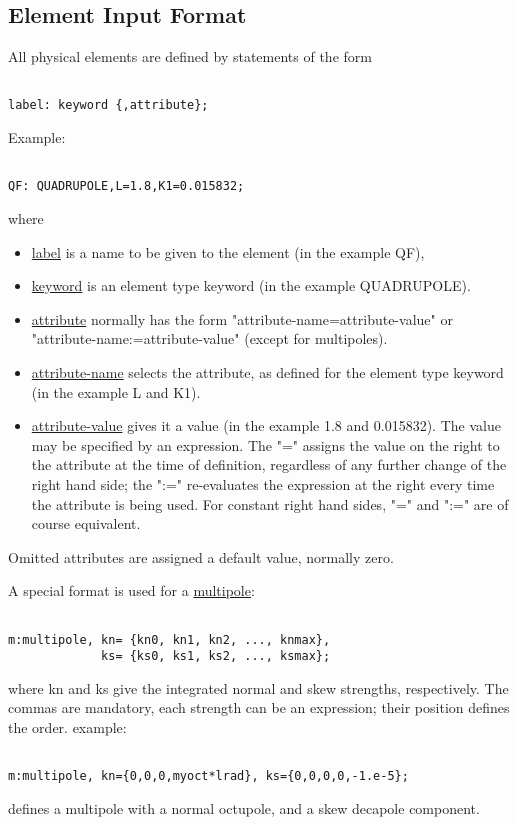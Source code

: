 




\subsection{Element Input Format}

 All physical elements are defined by statements of the form 
\begin{verbatim}

label: keyword {,attribute};
\end{verbatim} Example: 
\begin{verbatim}

QF: QUADRUPOLE,L=1.8,K1=0.015832;
\end{verbatim} where 
\begin{itemize}
	\item \href{label.html}{label} is a name to be given to the element (in the example QF), 
	\item \href{keyword.html}{keyword} is an element type keyword (in the example QUADRUPOLE). 
	\item \href{attribute.html}{attribute} normally has the form "attribute-name=attribute-value" or "attribute-name:=attribute-value" (except for multipoles). 
	\item \href{label.html}{attribute-name} selects the attribute, as defined for the element type keyword (in the example L and K1). 
	\item \href{attribute.html}{attribute-value} gives it a value (in the example 1.8 and 0.015832). The value may be specified by an expression. The "=" assigns the value on the right to the attribute at the time of definition, regardless of any further change of the right hand side; the ":=" re-evaluates the expression at the right every time the attribute is being used. For constant right hand sides, "=" and ":=" are of course equivalent. 
\end{itemize} Omitted attributes are assigned a default value, normally zero. 

 A special format is used for a \href{multipole.html}{multipole}: 
\begin{verbatim}

m:multipole, kn= {kn0, kn1, kn2, ..., knmax},
             ks= {ks0, ks1, ks2, ..., ksmax};
\end{verbatim} where kn and ks give the integrated normal and skew strengths, respectively. The commas are mandatory, each strength can be an expression; their position defines the order. example: 
\begin{verbatim}

m:multipole, kn={0,0,0,myoct*lrad}, ks={0,0,0,0,-1.e-5};
\end{verbatim} defines a multipole with a normal octupole, and a skew decapole component. 

